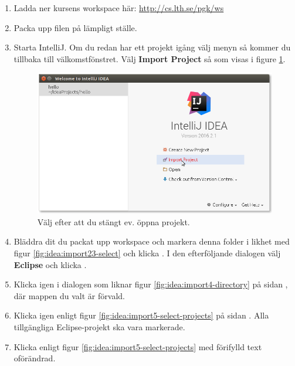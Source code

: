 \begin{enumerate}
\item Ladda ner kursens workspace här: \url{http://cs.lth.se/pgk/ws}

\item Packa upp filen på lämpligt ställe.

\item Starta IntelliJ. Om du redan har ett projekt igång välj menyn  så kommer du tillbaka till välkomstfönstret. Välj \textbf{Import Project} så som visas i figure \ref{fig:idea:import1-project}.

\begin{figure}[H]
\centering
\includegraphics[width=1.0\textwidth]{../img/intellij/idea-import1-project.png}
\caption{Välj  efter att du stängt ev. öppna projekt.}
\label{fig:idea:import1-project}
\end{figure}

\item Bläddra dit du packat upp workspace och markera denna folder i likhet med figur \ref{fig:idea:import23-select} och klicka . I den efterföljande dialogen välj \textbf{Eclipse} och klicka .

\item Klicka  igen i dialogen som liknar figur \ref{fig:idea:import4-directory} på sidan \pageref{fig:idea:import4-directory}, där mappen du valt är förvald.

\item Klicka  igen enligt figur \ref{fig:idea:import5-select-projects} på sidan  \pageref{fig:idea:import5-select-projects}. Alla tillgängliga Eclipse-projekt ska vara markerade.

\item Klicka  enligt figur \ref{fig:idea:import5-select-projects} med förifylld text oförändrad.


\end{enumerate}
